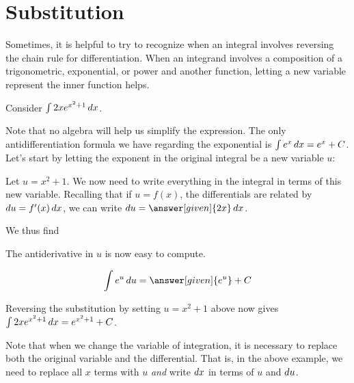 \documentclass[nooutcomes]{ximera}
\begin{document}
  
\section{Substitution}

Sometimes, it is helpful to try to recognize when an integral involves reversing the chain rule for differentiation. When an integrand involves a composition of a trigonometric, exponential, or power and another function, letting a new variable represent the inner function helps.

\begin{example}
Consider $\int 2x e^{x^2+1} \mathop{}\!d x$.  

Note that no algebra will help us simplify the expression.  The only antidifferentiation formula we have regarding the exponential is $\int e^x \mathop{}\!d x = e^x +C$.  Let's start by letting the exponent in the original integral be a new variable $u$:

Let $u= x^2+1$.  We now need to write everything in the integral in terms of this new variable.  Recalling that if $u = f(x)$, the differentials are related by $\mathop{}\!d u = f'(x) \mathop{}\!d x$, we can write $\d u = \answer[given]{2x} \d x$.

We thus find

\begin{image}
  \end{image}




The antiderivative in $u$ is now easy to compute.  

\[ \int e^u \d u = \answer[given]{e^u}+C \]

Reversing the substitution by setting $u=x^2+1$ above  now gives $\int 2xe^{x^2+1} \mathop{}\!d x = e^{x^2+1}+C$.

\end{example}

\begin{remark}
Note that when we change the variable of integration, it is necessary to replace both the original variable and the differential.  That is, in the above example, we need to replace all $x$ terms with $u$ \emph{and} write $\mathop{}\!d x$ in terms of $u$ and $\mathop{}\!d u$. 
\end{remark}
\end{document}
